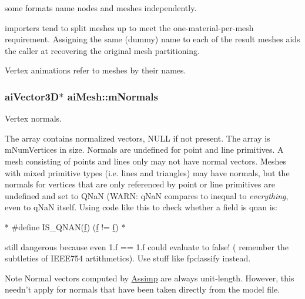 \begin{DoxyItemize}
\item some formats name nodes and meshes independently.
\item importers tend to split meshes up to meet the one-\/material-\/per-\/mesh requirement. Assigning the same (dummy) name to each of the result meshes aids the caller at recovering the original mesh partitioning.
\item Vertex animations refer to meshes by their names. 
\end{DoxyItemize}\hypertarget{structai_mesh_aec81b496b4d93838cef038933dabe9b9}{
\subsubsection[{m\-Normals}]{ {\bf ai\-Vector3\-D}$\ast$ ai\-Mesh\-::m\-Normals}}\label{structai_mesh_aec81b496b4d93838cef038933dabe9b9}
\begin{DoxyVerb}Vertex normals. 
\end{DoxyVerb}
 The array contains normalized vectors, N\-U\-L\-L if not present. The array is m\-Num\-Vertices in size. Normals are undefined for point and line primitives. A mesh consisting of points and lines only may not have normal vectors. Meshes with mixed primitive types (i.\-e. lines and triangles) may have normals, but the normals for vertices that are only referenced by point or line primitives are undefined and set to Q\-Na\-N (W\-A\-R\-N\-: q\-Na\-N compares to inequal to {\itshape everything}, even to q\-Na\-N itself. Using code like this to check whether a field is qnan is\-: 
\begin{DoxyCode}
* #define IS\_QNAN(\hyperlink{_g_l_e_w_2glew_8h_aba8ad56949f59242bc167b073dae3715}{f}) (\hyperlink{_g_l_e_w_2glew_8h_aba8ad56949f59242bc167b073dae3715}{f} != \hyperlink{_g_l_e_w_2glew_8h_aba8ad56949f59242bc167b073dae3715}{f})
* 
\end{DoxyCode}
 still dangerous because even 1.\-f == 1.\-f could evaluate to false! ( remember the subtleties of I\-E\-E\-E754 artithmetics). Use stuff like {\ttfamily fpclassify} instead. \begin{DoxyNote}{Note}
Normal vectors computed by \hyperlink{namespace_assimp}{Assimp} are always unit-\/length. However, this needn't apply for normals that have been taken directly from the model file. 
\end{DoxyNote}
